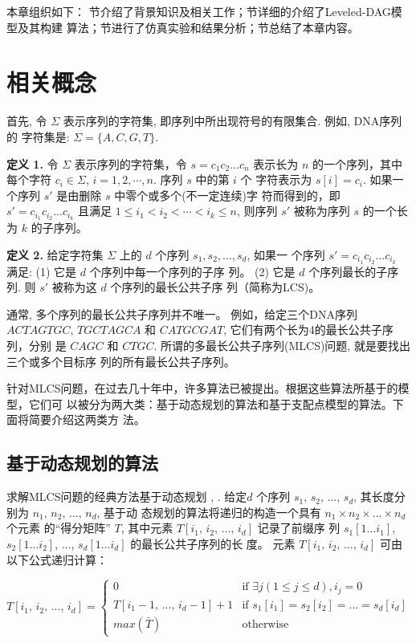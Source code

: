 \documentclass[utf8]{frontiersSCNS} %
\begin{document}
本章组织如下： 节介绍了背景知识及相关工作；节详细的介绍了Leveled-DAG模型及其构建
算法；节进行了仿真实验和结果分析；节总结了本章内容。



\section{相关概念}
\label{sec:MM}

首先, 令 $\Sigma$ 表示序列的字符集, 即序列中所出现符号的有限集合. 例如, DNA序列的
字符集是: $\Sigma=\{A, C, G, T\}$.

\textbf{定义 1.} 令 $\Sigma$ 表示序列的字符集，令 $s=c_1c_2...c_n$ 表示长为 $n$
的一个序列，其中每个字符 $c_i\in\Sigma$, $i=1,2,\cdots,n$. 序列 $s$ 中的第 $i$ 个
字符表示为 $s[i]=c_i$. 如果一个序列 $s'$ 是由删除 $s$ 中零个或多个(不一定连续)字
符而得到的，即 $s'=c_{i_1}c_{i_2}...c_{i_k}$ 且满足 $1 \leq i_1<i_2<\cdots<i_k
\leq n$, 则序列 $s'$ 被称为序列 $s$ 的一个长为 $k$ 的子序列。

\textbf{定义 2.} 给定字符集 $\Sigma$ 上的 $d$ 个序列 $s_1, s_2, ..., s_d$, 如果一
个序列 $s'=c_{i_1}c_{i_2}...c_{i_k}$ 满足: (1) 它是 $d$ 个序列中每一个序列的子序
列。 (2) 它是 $d$ 个序列最长的子序列. 则 $s'$ 被称为这 $d$ 个序列的最长公共子序
列（简称为LCS)。

通常, 多个序列的最长公共子序列并不唯一。 例如，给定三个DNA序列 $ACTAGTGC$,
$TGCTAGCA$ 和 $CATGCGAT$, 它们有两个长为4的最长公共子序列，分别
是 $CAGC$ 和 $CTGC$. 所谓的多最长公共子序列(MLCS)问题, 就是要找出三个或多个目标序
列的所有最长公共子序列。

针对MLCS问题，在过去几十年中，许多算法已被提出。根据这些算法所基于的模型，它们可
以被分为两大类：基于动态规划的算法和基于支配点模型的算法。下面将简要介绍这两类方
法。

\subsection{基于动态规划的算法}
\label {sec:Dynamic Programming}

求解MLCS问题的经典方法基于动态规划 \cite{Smith1981}, \cite{Sankoff1972}. 给定$d$
个序列 $s_1,\, s_2,\,...,\, s_d$, 其长度分别为 $n_1,\, n_2,\, ...,\, n_d$, 基于动
态规划的算法将递归的构造一个具有 $n_1 \times n_2 \times ... \times n_d$ 个元素
的“得分矩阵” $T$, 其中元素 $T[i_1,\, i_2,\, ...,\, i_d]$ 记录了前缀序
列 $s_1[1...i_1]$, $s_2[1...i_2]$, ..., $s_d[1...i_d]$ 的最长公共子序列的长
度。 元素 $T[i_1,\, i_2,\, ...,\, i_d]$ 可由以下公式递归计算：

\begin{equation}
  T[i_1,\, i_2,\, ...,\, i_d] =
  \begin{cases}
    0 & \text{if $\exists j(1 \leq j \leq d), i_j = 0$}\\
    T[i_1-1,\, ...,\, i_d-1] + 1  & \text{if $s_1[i_1] = s_2[i_2] =
      ... = s_d[i_d]$}\\
    max(\bar{T}) & \text{otherwise}
  \end{cases}
\end{equation}
\end{document}

